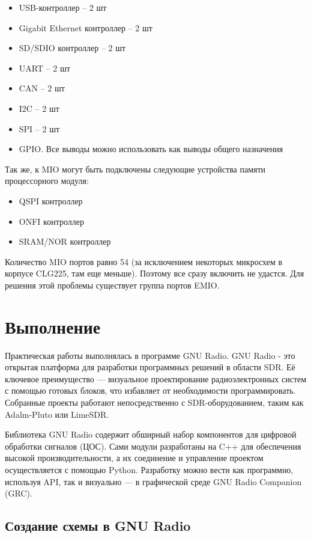 \begin{itemize}
    \item USB-контроллер – 2 шт
    \item Gigabit Ethernet контроллер – 2 шт
    \item SD/SDIO контроллер – 2 шт
    \item UART – 2 шт
    \item CAN – 2 шт
    \item I2C – 2 шт
    \item SPI – 2 шт
    \item GPIO. Все выводы можно использовать как выводы общего назначения
\end{itemize}

Так же, к MIO могут быть подключены следующие устройства памяти процессорного модуля:

\begin{itemize}
    \item QSPI контроллер
    \item ONFI контроллер
    \item SRAM/NOR контроллер
\end{itemize}

Количество MIO портов равно 54 (за исключением некоторых микросхем в корпусе CLG225, там еще меньше). Поэтому все сразу включить не удастся. Для решения этой проблемы существует группа портов EMIO.

\section*{Выполнение}

Практическая работы выполнялась в программе GNU Radio. GNU Radio - это открытая платформа для разработки программных решений в области SDR.
Её ключевое преимущество — визуальное проектирование радиоэлектронных систем с помощью готовых блоков, что избавляет от необходимости
программировать. Собранные проекты работают непосредственно с SDR-оборудованием, таким как Adalm-Pluto или LimeSDR.

Библиотека GNU Radio содержит обширный набор компонентов для цифровой обработки сигналов (ЦОС). Сами модули разработаны на C++
для обеспечения высокой производительности, а их соединение и управление проектом осуществляется с помощью Python.
Разработку можно вести как программно, используя API, так и визуально — в графической среде GNU Radio Companion (GRC).

\subsection*{Создание схемы в GNU Radio}

